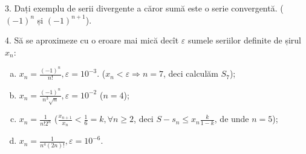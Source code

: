 \documentclass[11pt,a4paper]{article}
\theoremstyle{dotless}
\theoremstyle{dotlessdr}
\begin{document}
\vspace{1cm}

3. Dați exemplu de serii divergente a căror sumă este o serie convergentă.
($(-1)^n$ și $(-1)^{n + 1}$).

\vspace{1cm}

4. Să se aproximeze cu o eroare mai mică decît $\varepsilon$ sumele
seriilor definite de șirul $x_n$:
\begin{enumerate}[(a)]
  \item $x_n = \frac{(-1)^n}{n!}, \varepsilon = 10^{-3}$. ($x_n < \varepsilon \Rightarrow n = 7$,
    deci calculăm $S_7$);
  \item $x_n = \frac{(-1)^n}{n^3 \sqrt{n}}, \varepsilon = 10^{-2}$ ($n = 4$);
  \item $x_n = \frac{1}{n! 2^n}$ ($\frac{x_{n + 1}}{x_n} < \frac{1}{6} = k, \forall n \geq 2$,
    deci $S - s_n \leq x_n \frac{k}{1 - k}$, de unde $n = 5$);
  \item $x_n = \frac{1}{n^4 (2n)!}, \varepsilon = 10^{-6}$.
\end{enumerate}
\end{document}
